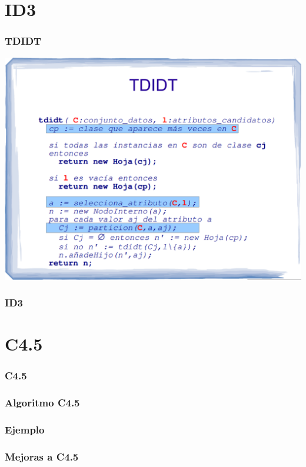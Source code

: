 \section{ID3}
\begin{frame}
  \frametitle{TDIDT}
\includegraphics[width=\textwidth]{./images/esquemaTDIDT.png}
\end{frame}

\begin{frame}
  \frametitle{ID3}
\end{frame}

\section{C4.5}
\begin{frame}
  \frametitle{C4.5}
\end{frame}

\begin{frame}
  \frametitle{Algoritmo C4.5}
\end{frame}

\begin{frame}
  \frametitle{Ejemplo}
\end{frame}

\begin{frame}
  \frametitle{Mejoras a C4.5}
\end{frame}

